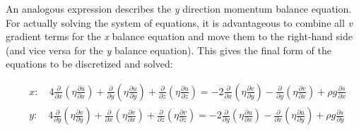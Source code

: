 An analogous expression describes the \textit{y} direction momentum balance equation. For actually solving the system of equations, it is advantageous to combine all \textit{v} gradient terms for the \textit{x} balance equation and move them to the right-hand side (and vice versa for the \textit{y} balance equation). This gives the final form of the equations to be discretized and solved:


\begin{align*}
  & x:\quad 4\frac{\partial }{\partial x}\left( \eta \frac{\partial u}{\partial x} \right)+\frac{\partial }{\partial y}\left( \eta \frac{\partial u}{\partial y} \right)+\frac{\partial }{\partial z}\left( \eta \frac{\partial u}{\partial z} \right)=-2\frac{\partial }{\partial x}\left( \eta \frac{\partial v}{\partial y} \right)-\frac{\partial }{\partial y}\left( \eta \frac{\partial v}{\partial x} \right)+\rho g\frac{\partial s}{\partial x} \\ 
 & y:\quad 4\frac{\partial }{\partial y}\left( \eta \frac{\partial v}{\partial y} \right)+\frac{\partial }{\partial x}\left( \eta \frac{\partial v}{\partial x} \right)+\frac{\partial }{\partial z}\left( \eta \frac{\partial v}{\partial z} \right)=-2\frac{\partial }{\partial y}\left( \eta \frac{\partial u}{\partial x} \right)-\frac{\partial }{\partial x}\left( \eta \frac{\partial u}{\partial y} \right)+\rho g\frac{\partial s}{\partial y} \\ 
\end{align*}

%
%
%